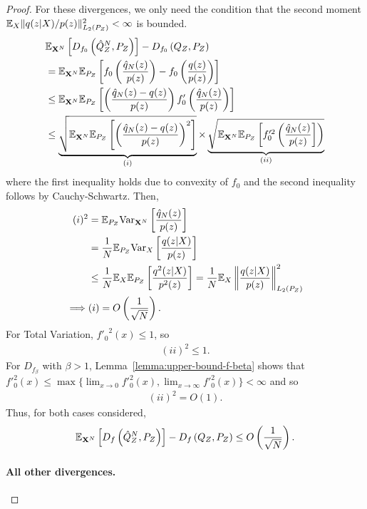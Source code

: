 \begin{proof}
For these divergences, we only need the condition that the second moment $\mathbb{E}_X \| q(z|X)/p(z)\|^2_{L_2(P_Z)} < \infty$ is bounded.
%
\begin{align*}
    & \mathbb{E}_{\mathbf{X}^N} \left[ D_{f_0}\left( \hat{Q}_Z^N , P_Z\right)\right] - D_{f_0}\left( Q_{Z} , P_Z\right)  \\
    &= \mathbb{E}_{\mathbf{X}^N}\mathbb{E}_{P_Z} \left[ f_0\left( \frac{\hat{q}_N(z)}{p(z)} \right) - f_0\left( \frac{q(z)}{p(z)} \right) \right] \\
    &\leq \mathbb{E}_{\mathbf{X}^N}\mathbb{E}_{P_Z} \left[ \left( \frac{\hat{q}_N(z) - q(z)}{p(z)} \right)     f_0'\left(\frac{\hat{q}_N(z)}{p(z)} \right) \right]  \\
    &\leq \underbrace{ \sqrt{ \mathbb{E}_{\mathbf{X}^N}\mathbb{E}_{P_Z} \left[\left( \frac{\hat{q}_N(z) - q(z)}{p(z)} \right)^2\right] }}_{(i)} 
    \times 
    \underbrace{\sqrt{\mathbb{E}_{\mathbf{X}^N}\mathbb{E}_{P_Z} \left[ f_0'^2\left(\frac{\hat{q}_N(z)}{p(z)}\right] \right) }}_{(ii)}
\end{align*}
where the first inequality holds due to convexity of $f_0$ and the second inequality follows by Cauchy-Schwartz.
Then,
\begin{align*}
    (i)^2 
    &= \mathbb{E}_{P_Z} \text{Var}_{\mathbf{X}^N}\left[\frac{\hat{q}_N(z)}{p(z)} \right]\\
    &= \frac{1}{N}\mathbb{E}_{P_Z} \text{Var}_{X}\left[\frac{q(z|X)}{p(z)} \right]\\
    &\leq \frac{1}{N}\mathbb{E}_{X} \mathbb{E}_{P_Z} \left[ \frac{q^2(z|X)}{p^2(z)} \right] = \frac{1}{N} \mathbb{E}_X \left\| \frac{q(z|X)}{p(z)} \right\|^2_{L_2(P_Z)}\\
    \implies & (i) = O\left(\frac{1}{\sqrt{N}}\right).
\end{align*}
%
For Total Variation, ${f'_0}^2(x) \leq 1$, so
\begin{align*}
    (ii)^2 \leq 1.
\end{align*}
%
For $D_{f_\beta}$ with $\beta>1$, Lemma~\ref{lemma:upper-bound-f-beta} shows that $f'^2_0(x) \leq \max\{\lim_{x\to 0}f'^2_0(x), \lim_{x\to \infty}f'^2_0(x)\} < \infty$ and so 
\begin{align*}
    (ii)^2 = O(1).
\end{align*}
%
Thus, for both cases considered,
\begin{align*}
    \mathbb{E}_{\mathbf{X}^N} \left[ D_f\left( \hat{Q}_Z^N , P_Z\right)\right] - D_f\left( Q_{Z} , P_Z\right) \leq O\left( \frac{1}{\sqrt{N}} \right).
\end{align*}

\paragraph{All other divergences.}


\end{proof}
